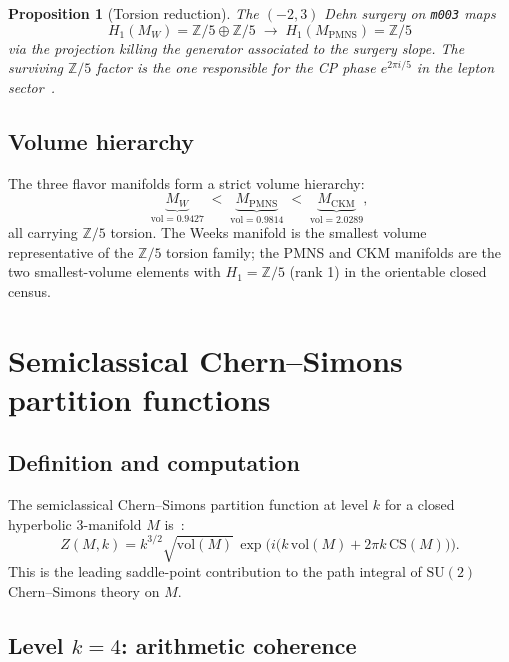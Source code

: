 \documentclass[12pt]{article}
\newtheorem{proposition}[theorem]{Proposition}
\theoremstyle{definition}
\begin{document}
\begin{proposition}[Torsion reduction]
\label{prop:torsion}
The $(-2,3)$ Dehn surgery on \texttt{m003} maps
\[
  H_1(M_W) = \mathbb{Z}/5\oplus\mathbb{Z}/5
  \;\longrightarrow\;
  H_1(M_\mathrm{PMNS}) = \mathbb{Z}/5
\]
via the projection killing the generator associated to the surgery
slope. The surviving $\mathbb{Z}/5$ factor is the one responsible for
the CP phase $e^{2\pi i/5}$ in the lepton sector~\cite{Gentry:CP}.
\end{proposition}

\subsection{Volume hierarchy}

The three flavor manifolds form a strict volume hierarchy:
\[
  \underbrace{M_W}_{\mathrm{vol}=0.9427}
  \;<\;
  \underbrace{M_\mathrm{PMNS}}_{\mathrm{vol}=0.9814}
  \;<\;
  \underbrace{M_\mathrm{CKM}}_{\mathrm{vol}=2.0289},
\]
all carrying $\mathbb{Z}/5$ torsion. The Weeks manifold is the
smallest volume representative of the $\mathbb{Z}/5$ torsion family;
the PMNS and CKM manifolds are the two smallest-volume elements with
$H_1 = \mathbb{Z}/5$ (rank 1) in the orientable closed census.

\section{Semiclassical Chern--Simons partition functions}
\label{sec:partfn}

\subsection{Definition and computation}

The semiclassical Chern--Simons partition function at level $k$ for
a closed hyperbolic 3-manifold $M$ is~\cite{Witten1989}:
\begin{equation}
  Z(M,k) = k^{3/2}\sqrt{\mathrm{vol}(M)}\,
  \exp\!\bigl(i\bigl(k\,\mathrm{vol}(M)
  + 2\pi k\,\mathrm{CS}(M)\bigr)\bigr).
  \label{eq:partfn}
\end{equation}
This is the leading saddle-point contribution to the path integral of
$\mathrm{SU}(2)$ Chern--Simons theory on $M$.

\subsection{Level $k = 4$: arithmetic coherence}
\end{document}
